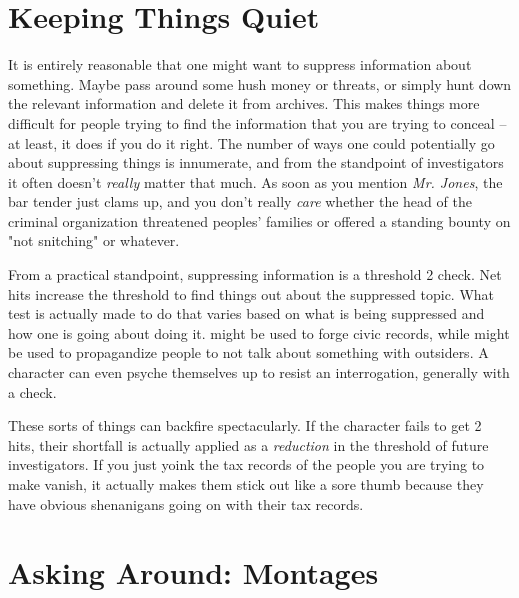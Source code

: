 \section{Keeping Things Quiet}

It is entirely reasonable that one might want to suppress information about something. Maybe pass around some hush money or threats, or simply hunt down the relevant information and delete it from archives. This makes things more difficult for people trying to find the information that you are trying to conceal -- at least, it does if you do it right. The number of ways one could potentially go about suppressing things is innumerate, and from the standpoint of investigators it often doesn't \textit{really} matter that much. As soon as you mention \textit{Mr. Jones}, the bar tender just clams up, and you don't really \textit{care} whether the head of the criminal organization threatened peoples' families or offered a standing bounty on "not snitching" or whatever.

From a practical standpoint, suppressing information is a threshold 2 check. Net hits increase the threshold to find things out about the suppressed topic. What test is actually made to do that varies based on what is being suppressed and how one is going about doing it.  might be used to forge civic records, while  might be used to propagandize people to not talk about something with outsiders. A character can even psyche themselves up to resist an interrogation, generally with a  check.

These sorts of things can backfire spectacularly. If the character fails to get 2 hits, their shortfall is actually applied as a \textit{reduction} in the threshold of future investigators. If you just yoink the tax records of the people you are trying to make vanish, it actually makes them stick out like a sore thumb because they have obvious shenanigans going on with their tax records.

\section{Asking Around: Montages} 

